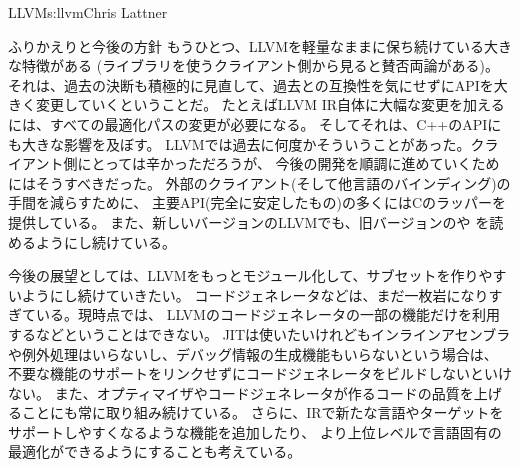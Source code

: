 \begin{aosachapter}{LLVM}{s:llvm}{Chris Lattner}
\begin{aosasect1}{ふりかえりと今後の方針}
もうひとつ、LLVMを軽量なままに保ち続けている大きな特徴がある
(ライブラリを使うクライアント側から見ると賛否両論がある)。
それは、過去の決断も積極的に見直して、過去との互換性を気にせずにAPIを大きく変更していくということだ。
たとえばLLVM IR自体に大幅な変更を加えるには、すべての最適化パスの変更が必要になる。
そしてそれは、C++のAPIにも大きな影響を及ぼす。
LLVMでは過去に何度かそういうことがあった。クライアント側にとっては辛かっただろうが、
今後の開発を順調に進めていくためにはそうすべきだった。
外部のクライアント(そして他言語のバインディング)の手間を減らすために、
主要API(完全に安定したもの)の多くにはCのラッパーを提供している。
また、新しいバージョンのLLVMでも、旧バージョンのや
を読めるようにし続けている。

今後の展望としては、LLVMをもっとモジュール化して、サブセットを作りやすいようにし続けていきたい。
コードジェネレータなどは、まだ一枚岩になりすぎている。現時点では、
LLVMのコードジェネレータの一部の機能だけを利用するなどということはできない。
JITは使いたいけれどもインラインアセンブラや例外処理はいらないし、デバッグ情報の生成機能もいらないという場合は、
不要な機能のサポートをリンクせずにコードジェネレータをビルドしないといけない。
また、オプティマイザやコードジェネレータが作るコードの品質を上げることにも常に取り組み続けている。
さらに、IRで新たな言語やターゲットをサポートしやすくなるような機能を追加したり、
より上位レベルで言語固有の最適化ができるようにすることも考えている。


\end{aosasect1}
\end{aosachapter}
